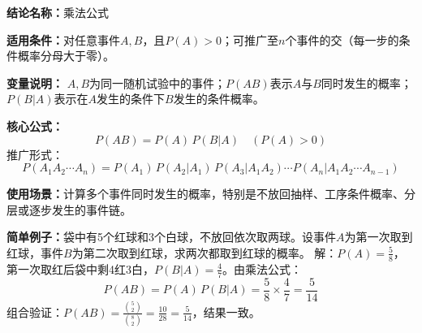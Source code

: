 \textbf{结论名称：}乘法公式

\textbf{适用条件：}对任意事件\(A,B\)，且\(P(A)>0\)；可推广至\(n\)个事件的交（每一步的条件概率分母大于零）。

\textbf{变量说明：} \(A,B\)为同一随机试验中的事件；\(P(AB)\)表示\(A\)与\(B\)同时发生的概率；\(P(B|A)\)表示在\(A\)发生的条件下\(B\)发生的条件概率。

\textbf{核心公式：} 
\[
\boxed{P(AB)=P(A)\,P(B|A)\quad (P(A)>0)}
\]
推广形式：
\[
P(A_1A_2\cdots A_n)=P(A_1)\,P(A_2|A_1)\,P(A_3|A_1A_2)\cdots P(A_n|A_1A_2\cdots A_{n-1})
\]

\textbf{使用场景：}计算多个事件同时发生的概率，特别是不放回抽样、工序条件概率、分层或逐步发生的事件链。

\textbf{简单例子：}袋中有5个红球和3个白球，不放回依次取两球。设事件\(A\)为第一次取到红球，事件\(B\)为第二次取到红球，求两次都取到红球的概率。
解：\(P(A)=\frac{5}{8}\)，第一次取红后袋中剩4红3白，\(P(B|A)=\frac{4}{7}\)。由乘法公式：
\[
P(AB)=P(A)\,P(B|A)=\frac{5}{8}\times\frac{4}{7}=\frac{5}{14}
\]
组合验证：\(P(AB)=\frac{\binom{5}{2}}{\binom{8}{2}}=\frac{10}{28}=\frac{5}{14}\)，结果一致。